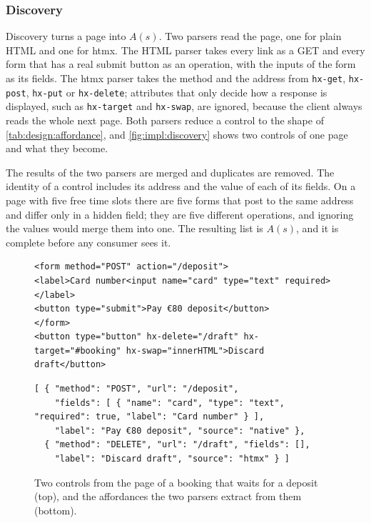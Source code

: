 \subsubsection{Discovery}\label{sec:impl:discovery}

Discovery turns a page into $A(s)$.
Two parsers read the page, one for plain HTML and one for htmx.
The HTML parser takes every link as a GET and every form that has a real submit button as an operation, with the inputs of the form as its fields.
The htmx parser takes the method and the address from \texttt{hx-get}, \texttt{hx-post}, \texttt{hx-put} or \texttt{hx-delete}; attributes that only decide how a response is displayed, such as \texttt{hx-target} and \texttt{hx-swap}, are ignored, because the client always reads the whole next page.
Both parsers reduce a control to the shape of \autoref{tab:design:affordance}, and \autoref{fig:impl:discovery} shows two controls of one page and what they become.

The results of the two parsers are merged and duplicates are removed.
The identity of a control includes its address and the value of each of its fields.
On a page with five free time slots there are five forms that post to the same address and differ only in a hidden field; they are five different operations, and ignoring the values would merge them into one.
The resulting list is $A(s)$, and it is complete before any consumer sees it.

\begin{figure}[htbp]
\centering
\begin{Verbatim}
<form method="POST" action="/deposit">
<label>Card number<input name="card" type="text" required></label>
<button type="submit">Pay €80 deposit</button>
</form>
<button type="button" hx-delete="/draft" hx-target="#booking" hx-swap="innerHTML">Discard draft</button>
\end{Verbatim}
\begin{Verbatim}
[ { "method": "POST", "url": "/deposit",
    "fields": [ { "name": "card", "type": "text", "required": true, "label": "Card number" } ],
    "label": "Pay €80 deposit", "source": "native" },
  { "method": "DELETE", "url": "/draft", "fields": [],
    "label": "Discard draft", "source": "htmx" } ]
\end{Verbatim}
\caption{Two controls from the page of a booking that waits for a deposit (top), and the affordances the two parsers extract from them (bottom).}
\label{fig:impl:discovery}
\end{figure}

